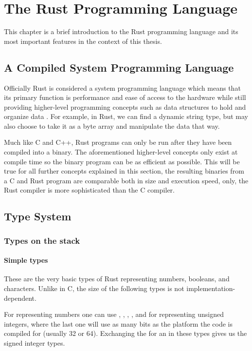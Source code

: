 \chapter{The Rust Programming Language}

This chapter is a brief introduction to the Rust programming language and its most important features in the context of this thesis.

\section{A Compiled System Programming Language}

Officially Rust is considered a system programming language which means that its primary function is performance and ease of access to the hardware while still providing higher-level programming concepts such as data structures to hold and organize data \cite{SystemProgrammingLanguageWikipedia}. For example, in Rust, we can find a dynamic string type, but may also choose to take it as a byte array and manipulate the data that way.

Much like C and C++, Rust programs can only be run after they have been compiled into a binary. The aforementioned higher-level concepts only exist at compile time so the binary program can be as efficient as possible. This will be true for all further concepts explained in this section, the resulting binaries from a C and Rust program are comparable both in size and execution speed, only, the Rust compiler is more sophisticated than the C compiler.

\section{Type System}

\subsection{Types on the stack}

\subsubsection{Simple types}

These are the very basic types of Rust representing numbers, booleans, and characters. Unlike in C, the size of the following types is not implementation-dependent.

For representing numbers one can use , , , ,  and  for representing unsigned integers, where the last one will use as many bits as the platform the code is compiled for (usually 32 or 64). Exchanging the  for an  in these types gives us the signed integer types.

